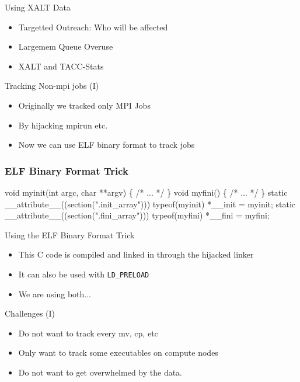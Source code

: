 \documentclass{beamer}
\begin{document}
\begin{frame}{Using XALT Data}
  \begin{itemize}
    \item Targetted Outreach: Who will be affected
    \item Largemem Queue Overuse
    \item XALT and TACC-Stats
  \end{itemize}
\end{frame}

\begin{frame}{Tracking Non-mpi jobs (I)}
  \begin{itemize}
    \item Originally we tracked only MPI Jobs
    \item By hijacking mpirun etc.
    \item Now we can use ELF binary format to track jobs
  \end{itemize}
\end{frame}

\begin{frame}[fragile]
    \frametitle{ELF Binary Format Trick}
 {\small
    \begin{semiverbatim}
void myinit(int argc, char **argv)
\{
  /* ... */
\}
void myfini()
\{
  /* ... */
\}
  static __attribute__((section(".init_array")))
       typeof(myinit) *__init = myinit;
  static __attribute__((section(".fini_array")))
       typeof(myfini) *__fini = myfini;
    \end{semiverbatim}
}
\end{frame}

\begin{frame}{Using the ELF Binary Format Trick}
  \begin{itemize}
    \item This C code is compiled and linked in through the hijacked linker
    \item It can also be used with \texttt{LD\_PRELOAD}
    \item We are using both...
  \end{itemize}
\end{frame}

\begin{frame}{Challenges (I)}
  \begin{itemize}
    \item Do not want to track every mv, cp, etc
    \item Only want to track some executables on compute nodes
    \item Do not want to get overwhelmed by the data. 
  \end{itemize}
\end{frame}
\end{document}

